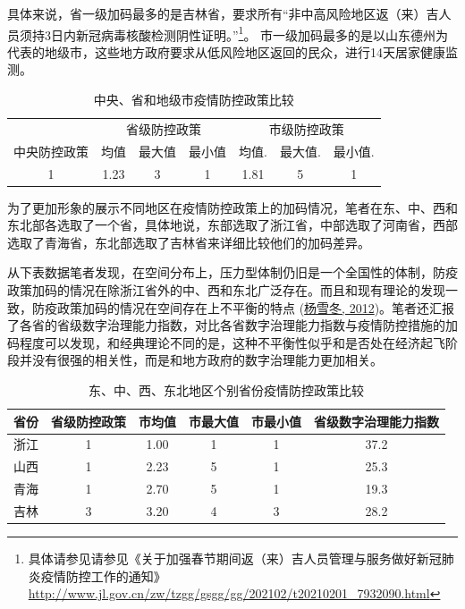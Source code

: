 \documentclass[
  12pt,
]{ctexart}
\begin{document}
具体来说，省一级加码最多的是吉林省，要求所有``非中高风险地区返（来）吉人员须持3日内新冠病毒核酸检测阴性证明。''\footnote{具体请参见请参见《关于加强春节期间返（来）吉人员管理与服务做好新冠肺炎疫情防控工作的通知》\url{http://www.jl.gov.cn/zw/tzgg/gsgg/gg/202102/t20210201_7932090.html}}。 市一级加码最多的是以山东德州为代表的地级市，这些地方政府要求从低风险地区返回的民众，进行14天居家健康监测。

\begin{table}[!h]

\caption{\label{tab:unnamed-chunk-2}中央、省和地级市疫情防控政策比较}
\centering
\begin{tabular}[t]{ccccccc}
\toprule
\multicolumn{1}{c}{ } & \multicolumn{3}{c}{省级防控政策} & \multicolumn{3}{c}{市级防控政策} \\
\cmidrule(l{3pt}r{3pt}){2-4} \cmidrule(l{3pt}r{3pt}){5-7}
中央防控政策 & 均值 & 最大值 & 最小值 & 均值. & 最大值. & 最小值.\\
\midrule
1 & 1.23 & 3 & 1 & 1.81 & 5 & 1\\
\bottomrule
\end{tabular}
\end{table}

为了更加形象的展示不同地区在疫情防控政策上的加码情况，笔者在东、中、西和东北部各选取了一个省，具体地说，东部选取了浙江省，中部选取了河南省，西部选取了青海省，东北部选取了吉林省来详细比较他们的加码差异。

从下表数据笔者发现，在空间分布上，压力型体制仍旧是一个全国性的体制，防疫政策加码的情况在除浙江省外的中、西和东北广泛存在。而且和现有理论的发现一致，防疫政策加码的情况在空间存在上不平衡的特点 (\protect\hyperlink{ref-YangXueDong2012}{杨雪冬, 2012})。笔者还汇报了各省的省级数字治理能力指数，对比各省数字治理能力指数与疫情防控措施的加码程度可以发现，和经典理论不同的是，这种不平衡性似乎和是否处在经济起飞阶段并没有很强的相关性，而是和地方政府的数字治理能力更加相关。

\begin{table}[!h]

\caption{\label{tab:unnamed-chunk-3}东、中、西、东北地区个别省份疫情防控政策比较}
\centering
\begin{tabular}[t]{cccccc}
\toprule
省份 & 省级防控政策 & 市均值 & 市最大值 & 市最小值 & 省级数字治理能力指数\\
\midrule
浙江 & 1 & 1.00 & 1 & 1 & 37.2\\
山西 & 1 & 2.23 & 5 & 1 & 25.3\\
青海 & 1 & 2.70 & 5 & 1 & 19.3\\
吉林 & 3 & 3.20 & 4 & 3 & 28.2\\
\bottomrule
\end{tabular}
\end{table}
\end{document}
